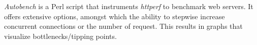 \emph{Autobench} is a Perl script that instruments \emph{httperf} to benchmark web servers. It offers extensive options, amongst which the ability to stepwise increase concurrent connections or the number of request. This results in graphs that visualize bottlenecks/tipping points.
